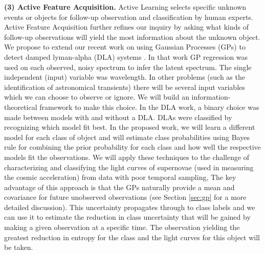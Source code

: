 \documentclass[useAMS,usenatbib,tightenlines,11pt,preprint]{aastex}
\begin{document}
{\bf (3) Active Feature Acquisition.}  Active Learning selects specific
unknown events or objects for follow-up observation and classification
by human experts.  Active Feature Acquisition further refines our
inquiry by asking what kinds of follow-up observations will yield the
most information about the unknown object.  We propose to extend our
recent work on using Gaussian Processes (GPs) to detect damped
lyman-alpha (DLA) systems \cite{Garnett12a}.  In that work GP
regression was used on each observed, noisy spectrum to infer the
latent spectrum.  The single independent (input) variable was
wavelength.  In other problems (such as the identification of
astronomical transients) there will be several input variables which
we can choose to observe or ignore.  
We will build an information-theoretical framework to make this choice.
In the DLA work, a binary choice was made between models with and
without a DLA.  DLAs were
classified by recognizing which model fit best.  In the proposed work,
we will learn a different model for each class of object and will
estimate class probabilities using Bayes rule for combining the prior
probability for each class and how well the respective models fit the
observations.  We will apply these techniques to the challenge of
characterizing and classifying the light curves of supernovae (used in measuring the
cosmic acceleration) from data with poor temporal sampling,
The key advantage of this
approach is that the GPs naturally provide a mean and covariance for
future unobserved observations (see Section \ref{sec:gp} for a more detailed
discussion).  This uncertainty propagates through
to class labels and we can use it to estimate the reduction in class
uncertainty that will be gained by making a given observation at a
specific time.  The observation yielding the greatest reduction in
entropy for the class and the light curves for this object will be
taken.
\end{document}
